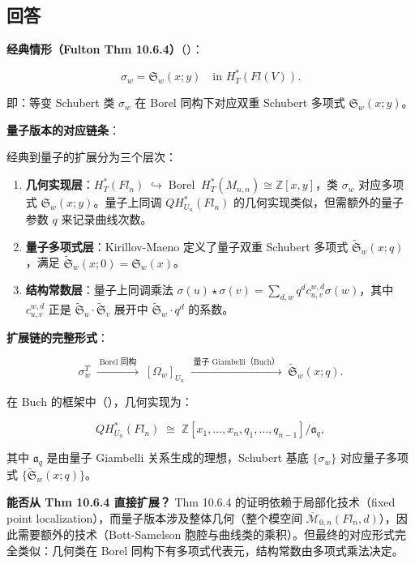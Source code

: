 \subsection{回答}
\textbf{经典情形（Fulton Thm 10.6.4）}（\cite[Thm 10.6.4]{AndersonFulton}）：

$$\sigma_w = \mathfrak{S}_w(x; y) \quad \text{in } H_T^*(Fl(V)).$$

即：等变 Schubert 类 $\sigma_w$ 在 Borel 同构下对应双重 Schubert 多项式 $\mathfrak{S}_w(x; y)$。

\textbf{量子版本的对应链条}：

经典到量子的扩展分为三个层次：

\begin{enumerate}
\item \textbf{几何实现层}：$H_T^*(Fl_n) \;\hookrightarrow{\;\text{Borel}\;}\; H_T^*(M_{n,n}) \cong \mathbb{Z}[x,y]$，类 $\sigma_w$ 对应多项式 $\mathfrak{S}_w(x; y)$。量子上同调 $QH_{U_n}^*(Fl_n)$ 的几何实现类似，但需额外的量子参数 $q$ 来记录曲线次数。
\item \textbf{量子多项式层}：Kirillov-Maeno 定义了量子双重 Schubert 多项式 $\widetilde{\mathfrak{S}}_w(x; q)$，满足 $\widetilde{\mathfrak{S}}_w(x; 0) = \mathfrak{S}_w(x)$。
\item \textbf{结构常数层}：量子上同调乘法 $\sigma(u) \star \sigma(v) = \sum_{d,w} q^d c_{u,v}^{w,d} \sigma(w)$，其中 $c_{u,v}^{w,d}$ 正是 $\widetilde{\mathfrak{S}}_u \cdot \widetilde{\mathfrak{S}}_v$ 展开中 $\widetilde{\mathfrak{S}}_w \cdot q^d$ 的系数。
\end{enumerate}

\textbf{扩展链的完整形式}：

$$\sigma_w^T \;\xrightarrow{\;\text{Borel 同构}\;}\; [\Omega_w]_{U_n} \;\xrightarrow{\;\text{量子 Giambelli（Buch）}\;}\; \widetilde{\mathfrak{S}}_w(x; q).$$

在 Buch 的框架中（\cite[Section 2]{Buch2003}），几何实现为：

$$QH_{U_n}^*(Fl_n) \;\cong\; \mathbb{Z}[x_1,\ldots,x_n, q_1,\ldots,q_{n-1}] / \mathfrak{a}_q,$$

其中 $\mathfrak{a}_q$ 是由量子 Giambelli 关系生成的理想，Schubert 基底 $\{\sigma_w\}$ 对应量子多项式 $\{\widetilde{\mathfrak{S}}_w(x; q)\}$。

\textbf{能否从 Thm 10.6.4 直接扩展？} Thm 10.6.4 的证明依赖于局部化技术（fixed point localization），而量子版本涉及整体几何（整个模空间 $\overline{\mathcal{M}}_{0,n}(Fl_n,d)$），因此需要额外的技术（Bott-Samelson 胞腔与曲线类的乘积）。但最终的对应形式完全类似：几何类在 Borel 同构下有多项式代表元，结构常数由多项式乘法决定。

